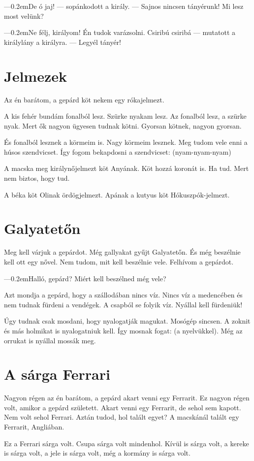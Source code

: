 \documentclass[12pt]{memoir}
\def\dash{---\kern 0.2em}
\begin{document}
\dash De ó jaj! — sopánkodott a király. — Sajnos nincsen tányérunk! Mi lesz most
velünk?

\dash Ne félj, királyom! Én tudok varázsolni. Csiribú csiribá — mutatott a
királylány a királyra. — Legyél tányér!


\section{Jelmezek}
Az én barátom, a gepárd köt nekem egy rókajelmezt.

A kis fehér bundám fonalból lesz. Szürke nyakam lesz. Az fonalból lesz, a
szürke nyak. Mert ők nagyon ügyesen tudnak kötni. Gyorsan kötnek, nagyon
gyorsan.

És fonalból lesznek a körmeim is. Nagy körmeim lesznek. Meg tudom vele enni a
húsos szendvicset. Így fogom bekapdosni a szendvicset: (nyam-nyam-nyam)

A macska meg királynőjelmezt köt Anyának. Köt hozzá koronát is. Ha tud. Mert
nem biztos, hogy tud.

A béka köt Olinak ördögjelmezt. Apának a kutyus köt Hókuszpók-jelmezt.


\section{Galyatetőn}
Meg kell várjuk a gepárdot. Még gallyakat gyűjt Galyatetőn. És még beszélnie
kell ott egy nővel. Nem tudom, mit kell beszélnie vele. Felhívom a gepárdot.

\dash Halló, gepárd? Miért kell beszélned még vele?

Azt mondja a gepárd, hogy a szállodában nincs víz. Nincs víz a medencében és
nem tudnak fürdeni a vendégek. A csapból se folyik víz. Nyállal kell fürdeniük!

Úgy tudnak csak mosdani, hogy nyalogatják magukat. Mosógép sincsen. A zoknit és
más holmikat is nyalogatniuk kell. Így mosnak fogat: (a nyelvükkel). Még az
orrukat is nyállal mossák meg.


\section{A sárga Ferrari}
Nagyon régen az én barátom, a gepárd akart venni egy Ferrarit. Ez nagyon régen
volt, amikor a gepárd született. Akart venni egy Ferrarit, de sehol sem kapott.
Nem volt sehol Ferrari. Aztán tudod, hol talált egyet? A macskánál talált egy
Ferrarit, Angliában.

Ez a Ferrari sárga volt. Csupa sárga volt mindenhol. Kívül is sárga volt, a
kereke is sárga volt, a jele is sárga volt, még a kormány is sárga volt.
\end{document}
